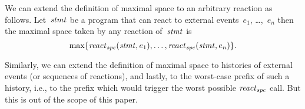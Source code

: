 We can extend the definition of maximal space to an arbitrary reaction as
follows.  Let~$\mathit{stmt}$ be a program that can react to external events~$e_1$,
\dots,~$e_n$ then the maximal space taken by any reaction of~$\mathit{stmt}$ is
\[
  \max\{\mathop{\mathit{react}}\nolimits_\mathit{spc}(\mathit{stmt},e_1),\dots,\mathop{\mathit{react}}\nolimits_\mathit{spc}(\mathit{stmt},e_n)\}.
\]

Similarly, we can extend the definition of maximal space to histories of
external events (or sequences of reactions), and lastly, to the worst-case
prefix of such a history, i.e., to the prefix which would trigger the worst
possible $\mathop{\mathit{react}}\nolimits_\mathit{spc}$ call.  But this is out of the scope of this paper.


